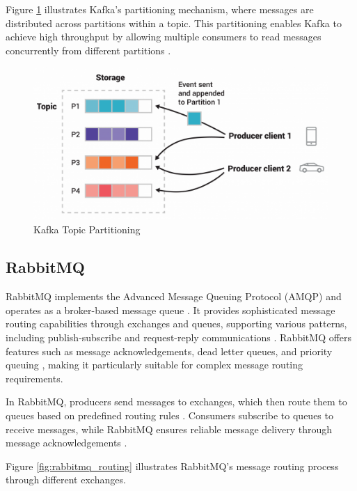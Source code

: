 Figure \ref{fig:kafka_partitioning} illustrates Kafka's partitioning mechanism, where messages are distributed across partitions within a topic. This partitioning enables Kafka to achieve high throughput by allowing multiple consumers to read messages concurrently from different partitions \cite{kafka_parallel}.
\begin{figure}[H]
    \centering
    \includegraphics[width=\textwidth]{figures/kafka_topics_partition.png}
    \caption{Kafka Topic Partitioning \cite{kafka_partitions}} 
    \label{fig:kafka_partitioning}
\end{figure}

\subsection{RabbitMQ}
RabbitMQ implements the Advanced Message Queuing Protocol (AMQP) \cite{rabbitmq_protocols} and operates as a broker-based message queue \cite{rabbitmq_definition}. It provides sophisticated message routing capabilities through exchanges and queues, supporting various patterns, including publish-subscribe and request-reply communications \cite{rabbitmq_routing}. RabbitMQ offers features such as message acknowledgements, dead letter queues, and priority queuing \cite{rabbitmq_routing}, making it particularly suitable for complex message routing requirements.

In RabbitMQ, producers send messages to exchanges, which then route them to queues based on predefined routing rules \cite{rabbitmq_routing}. Consumers subscribe to queues to receive messages, while RabbitMQ ensures reliable message delivery through message acknowledgements \cite{rabbitmq_ack}. 

Figure \ref{fig:rabbitmq_routing} illustrates RabbitMQ's message routing process through different exchanges. 

